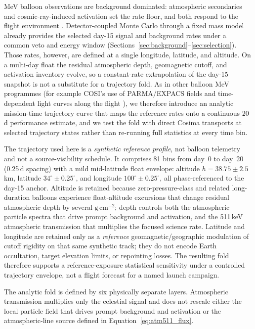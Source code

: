 \documentclass[11pt]{article}
\begin{document}
MeV balloon observations are background dominated: atmospheric secondaries and cosmic-ray-induced activation set the rate floor, and both respond to the flight environment \cite{Gallego2025Balloon,Kierans2017}. Detector-coupled Monte Carlo through a fixed mass model already provides the selected day-15 signal and background rates under a common veto and energy window (Sections~\ref{sec:background}--\ref{sec:selection}). Those rates, however, are defined at a single longitude, latitude, and altitude. On a multi-day float the residual atmospheric depth, geomagnetic cutoff, and activation inventory evolve, so a constant-rate extrapolation of the day-15 snapshot is not a substitute for a trajectory fold. As in other balloon MeV programmes (for example COSI's use of PARMA/EXPACS fields and time-dependent light curves along the flight \cite{Gallego2025Balloon}), we therefore introduce an analytic mission-time trajectory curve that maps the reference rates onto a continuous 20\,d performance estimate, and we test the fold with direct Cosima transports at selected trajectory states rather than re-running full statistics at every time bin.

The trajectory used here is a \emph{synthetic reference profile}, not balloon telemetry and not a source-visibility schedule. It comprises 81 bins from day~0 to day~20 (0.25\,d spacing) with a mild mid-latitude float envelope: altitude $h=38.75\pm2.5$\,km, latitude $34^\circ\pm0.25^\circ$, and longitude $100^\circ\pm0.25^\circ$, all phase-referenced to the day-15 anchor. Altitude is retained because zero-pressure-class and related long-duration balloons experience float-altitude excursions that change residual atmospheric depth by several $\mathrm{g\,cm^{-2}}$; depth controls both the atmospheric particle spectra that drive prompt background and activation, and the 511\,keV atmospheric transmission that multiplies the focused science rate. Latitude and longitude are retained only as a \emph{reference} geomagnetic/geographic modulation of cutoff rigidity on that same synthetic track; they do not encode Earth occultation, target elevation limits, or repointing losses. The resulting fold therefore supports a reference-exposure statistical sensitivity under a controlled trajectory envelope, not a flight forecast for a named launch campaign.

The analytic fold is defined by six physically separate layers. Atmospheric transmission multiplies only the celestial signal and does not rescale either the local particle field that drives prompt background and activation or the atmospheric-line source defined in Equation~\eqref{eq:atm511_flux}.
\end{document}
